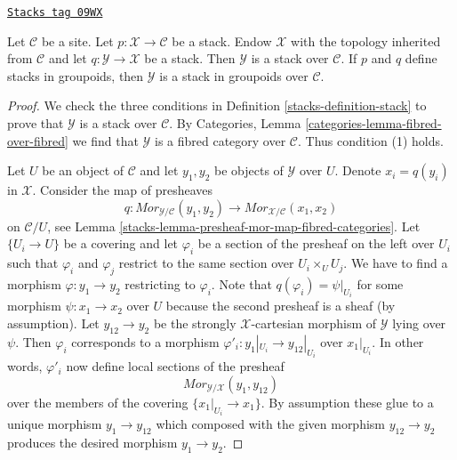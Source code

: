 \begin{lemma}
\label{stacks-lemma-stack-over-stack}
\href{https://stacks.math.columbia.edu/tag/09WX}{\texttt{Stacks tag 09WX}}

Let $\mathcal{C}$ be a site. Let $p : \mathcal{X} \to \mathcal{C}$
be a stack. Endow $\mathcal{X}$ with the topology inherited from
$\mathcal{C}$ and let $q : \mathcal{Y} \to \mathcal{X}$ be a stack.
Then $\mathcal{Y}$ is a stack over $\mathcal{C}$.
If $p$ and $q$ define stacks in groupoids, then
$\mathcal{Y}$ is a stack in groupoids over $\mathcal{C}$.
\end{lemma}

\begin{proof}

We check the three conditions in Definition \ref{stacks-definition-stack}
to prove that $\mathcal{Y}$ is a stack over $\mathcal{C}$.
By Categories, Lemma \ref{categories-lemma-fibred-over-fibred}
we find that $\mathcal{Y}$ is a fibred category over $\mathcal{C}$.
Thus condition (1) holds.

\medskip\noindent
Let $U$ be an object of $\mathcal{C}$ and let $y_1, y_2$ be objects
of $\mathcal{Y}$ over $U$. Denote $x_i = q(y_i)$ in $\mathcal{X}$.
Consider the map of presheaves
$$
q : \mathit{Mor}_{\mathcal{Y}/\mathcal{C}}(y_1, y_2)
\longrightarrow
\mathit{Mor}_{\mathcal{X}/\mathcal{C}}(x_1, x_2)
$$
on $\mathcal{C}/U$, see Lemma \ref{stacks-lemma-presheaf-mor-map-fibred-categories}.
Let $\{U_i \to U\}$ be a covering and let $\varphi_i$ be a section
of the presheaf on the left over $U_i$ such that $\varphi_i$ and
$\varphi_j$ restrict to the same section over $U_i \times_U U_j$.
We have to find a morphism $\varphi : y_1 \to y_2$ restricting to $\varphi_i$.
Note that $q(\varphi_i) = \psi|_{U_i}$ for some morphism
$\psi : x_1 \to x_2$ over $U$ because the second presheaf is a sheaf
(by assumption). Let $y_{12} \to y_2$ be the strongly $\mathcal{X}$-cartesian
morphism of $\mathcal{Y}$ lying over $\psi$. Then $\varphi_i$ corresponds
to a morphism $\varphi'_i : y_1|_{U_i} \to y_{12}|_{U_i}$ over $x_1|_{U_i}$.
In other words, $\varphi'_i$ now define local sections of the presheaf
$$
\mathit{Mor}_{\mathcal{Y}/\mathcal{X}}(y_1, y_{12})
$$
over the members of the covering $\{x_1|_{U_i} \to x_1\}$. By assumption these
glue to a unique morphism $y_1 \to y_{12}$ which composed with the given
morphism $y_{12} \to y_2$ produces the desired morphism $y_1 \to y_2$.


\end{proof}
